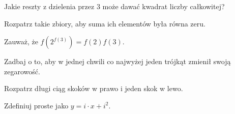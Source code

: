 
\begin{hints_list}
	\item Jakie reszty z dzielenia przez $3$ może dawać kwadrat liczby całkowitej?
	\item Rozpatrz takie zbiory, aby suma ich elementów była równa zeru.
	\item Zauważ, że $f(2^{f(3)}) = f(2)f(3)$.
	\item Zadbaj o to, aby w jednej chwili co najwyżej jeden trójkąt zmienił swoją zegarowość.
	\item Rozpatrz długi ciąg skoków w prawo i jeden skok w lewo.
	\item Zdefiniuj proste jako $y = i \cdot x + i^2$.
\end{hints_list}
